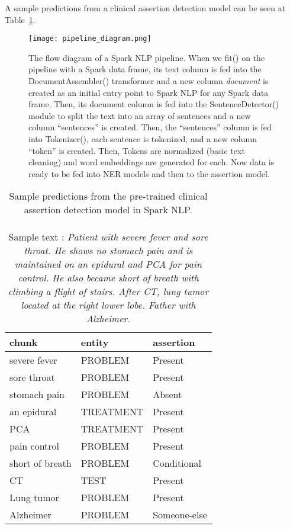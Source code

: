 \documentclass[letterpaper]{article} \usepackage{aaai21}  \usepackage{times}  \usepackage{helvet} \usepackage{courier}  \usepackage[hyphens]{url}  \usepackage{graphicx} \urlstyle{rm} \def\UrlFont{\rm}  \usepackage{natbib}  \usepackage{caption} \frenchspacing  \setlength{\pdfpagewidth}{8.5in}  \setlength{\pdfpageheight}{11in}  \usepackage{lscape}
\begin{document}
A sample predictions from a clinical assertion detection model can be seen at Table~\ref{tab:assertiondl}.

\begin{figure*}[ht!]
\texttt{[image: pipeline\_diagram.png]}
\centering
\caption{The flow diagram of a Spark NLP pipeline. When we fit() on the pipeline with a Spark data frame, its text column is fed into the DocumentAssembler() transformer and a new column \textit{document} is created as an initial entry point to Spark NLP for any Spark data frame. Then, its document column is fed into the SentenceDetector() module to split the text into an array of sentences and a new column “sentences” is created. Then, the “sentences” column is fed into Tokenizer(), each sentence is tokenized, and a new column “token” is created. Then, Tokens are normalized (basic text cleaning) and word embeddings are generated for each. Now data is ready to be fed into NER models and then to the assertion model. }
\label{fig:pipeline_diagram}
\end{figure*}

\begin{table}[ht!]
\caption{Sample predictions from the pre-trained clinical assertion detection model in Spark NLP. \\ 
\\Sample text : \textit{Patient with severe fever and sore throat. He shows no stomach pain and is maintained on an epidural and PCA for pain control. He also became short of breath with climbing a flight of stairs. After CT, lung tumor located at the right lower lobe. Father with Alzheimer.}}
\centering
\label{tab:assertiondl}
\begin{tabular}{lll}
\hline
chunk & entity & assertion \\\hline
severe fever & PROBLEM & Present \\
sore throat & PROBLEM & Present \\
stomach pain & PROBLEM & Absent \\
an epidural & TREATMENT & Present \\
PCA & TREATMENT & Present \\
pain control & PROBLEM & Present \\
short of breath & PROBLEM & Conditional \\
CT & TEST & Present \\
Lung tumor & PROBLEM & Present \\
Alzheimer & PROBLEM & Someone-else\\\hline
\end{tabular}
\end{table}
\end{document}
